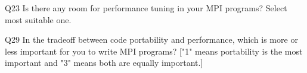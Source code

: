 \begin{description}%
\item{Q23} Is there any room for performance tuning in your MPI programs? Select most suitable one.%
\item{Q29} In the tradeoff between code portability and performance, which is more or less important for you to write MPI programs? ["1" means portability is the most important and "3" means both are equally important.]%
\end{description}%
